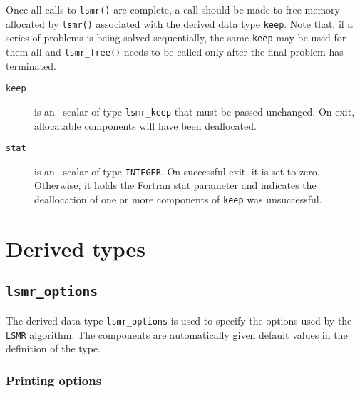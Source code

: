 \noindent
Once all  calls to \texttt{lsmr()} are complete,
a call should be made to free memory  allocated by
\texttt{lsmr()}  associated with the derived data type {\tt keep}.
Note that, if a series of problems is being solved sequentially, the same {\tt keep}
may be used for them all and {\tt lsmr\_free()} needs to be called only
after the final problem has terminated.

\begin{description}

\item[\texttt{keep}] is an \intentinout\ scalar  of type {\tt lsmr\_keep}
that must be passed unchanged.
On exit, allocatable components will have been deallocated.

\item[\texttt{stat}] is an \intentout\ scalar of type {\tt INTEGER}.
On successful exit, it is set to zero. Otherwise, it holds the Fortran stat
parameter and indicates the deallocation of one or more components of
{\tt keep} was unsuccessful.

\end{description}




\section{Derived types}
\subsection{\texttt{lsmr\_options}}
\label{LSMR:type:options}

The derived data type {\tt lsmr\_options} is used to specify the options used
by the \texttt{LSMR} algorithm. The components are automatically
given default values in the definition of the type.

\subsubsection*{Printing options}


